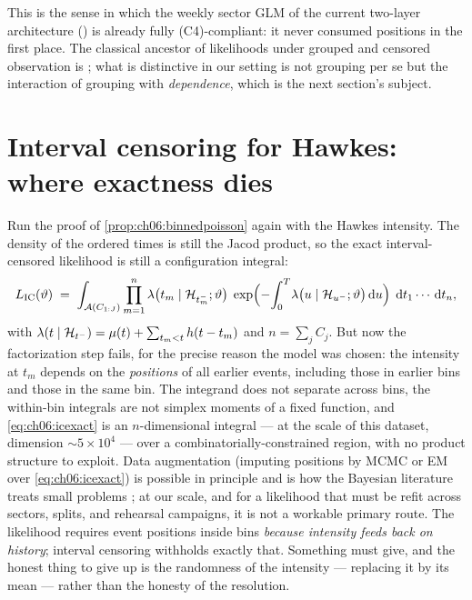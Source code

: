 This is the sense in which the weekly sector GLM of the current
two-layer architecture () is already fully
(C4)-compliant: it never consumed positions in the first place. The
classical ancestor of likelihoods under grouped and censored observation is
\citet{turnbull1976}; what is distinctive in our setting is not grouping
per se but the interaction of grouping with \emph{dependence}, which is the
next section's subject.

\section{Interval censoring for Hawkes: where exactness dies}\label{ch06:sec:ichawkes}

Run the proof of \cref{prop:ch06:binnedpoisson} again with the Hawkes
intensity. The density of the ordered times is still the Jacod product, so
the exact interval-censored likelihood is still a configuration integral:
\begin{equation}\label{eq:ch06:icexact}
L_{\mathrm{IC}}(\vartheta)
 \;=\;
 \int_{\mathcal{A}(C_{1:J})}
 \prod_{m=1}^{n} \lambda\big(t_m \mid \mathcal{H}_{t_m^-};\vartheta\big)\;
 \exp\!\Big({-}\!\int_0^{T}\!\lambda\big(u \mid \mathcal{H}_{u^-};
 \vartheta\big)\,\mathrm{d} u\Big)\;
 \,\mathrm{d} t_1 \cdots \,\mathrm{d} t_n,
\end{equation}
with $\lambda(t\mid\mathcal{H}_{t^-}) = \mu(t) + \sum_{t_m < t}h(t-t_m)$ and
$n = \sum_j C_j$. But now the factorization step fails, for the precise
reason the model was chosen: the intensity at $t_m$ depends on the
\emph{positions} of all earlier events, including those in earlier bins and
those in the same bin. The integrand does not separate across bins, the
within-bin integrals are not simplex moments of a fixed function, and
\cref{eq:ch06:icexact} is an $n$-dimensional integral --- at the scale of
this dataset, dimension $\sim 5\times 10^4$ --- over a
combinatorially-constrained region, with no product structure to exploit.
Data augmentation (imputing positions by MCMC or EM over
\cref{eq:ch06:icexact}) is possible in principle and is how the Bayesian
literature treats small problems \citep{rasmussen2013}; at our scale, and
for a likelihood that must be refit across sectors, splits, and rehearsal
campaigns, it is not a workable primary route. The likelihood requires
event positions inside bins \emph{because intensity feeds back on
history}; interval censoring withholds exactly that. Something must give,
and the honest thing to give up is the randomness of the intensity ---
replacing it by its mean --- rather than the honesty of the resolution.

